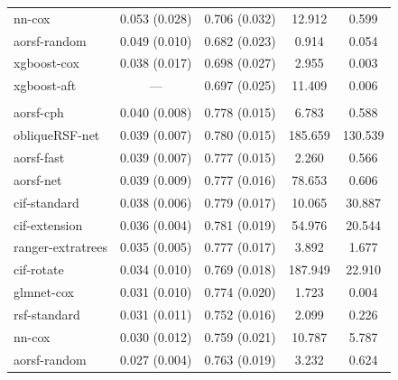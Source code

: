 \documentclass{article}\usepackage[]{graphicx}\usepackage[]{xcolor}
\newenvironment{knitrout}{}{} %
\begin{document}
\begin{knitrout}
\begin{longtable}[t]{lcccc}
\hspace{1em}nn-cox & 0.053 (0.028) & 0.706 (0.032) & 12.912 & 0.599\\
\hspace{1em}aorsf-random & 0.049 (0.010) & 0.682 (0.023) & 0.914 & 0.054\\
\hspace{1em}xgboost-cox & 0.038 (0.017) & 0.698 (0.027) & 2.955 & 0.003\\
\hspace{1em}xgboost-aft & --- & 0.697 (0.025) & 11.409 & 0.006\\
\addlinespace[0.3em]
\multicolumn{5}{l}{\textit{\textbf{JHS; coronary heart disease, n = 3501, p = 80}}}\\
\hline
\hspace{1em}aorsf-cph & 0.040 (0.008) & 0.778 (0.015) & 6.783 & 0.588\\
\hspace{1em}obliqueRSF-net & 0.039 (0.007) & 0.780 (0.015) & 185.659 & 130.539\\
\hspace{1em}aorsf-fast & 0.039 (0.007) & 0.777 (0.015) & 2.260 & 0.566\\
\hspace{1em}aorsf-net & 0.039 (0.009) & 0.777 (0.016) & 78.653 & 0.606\\
\hspace{1em}cif-standard & 0.038 (0.006) & 0.779 (0.017) & 10.065 & 30.887\\
\hspace{1em}cif-extension & 0.036 (0.004) & 0.781 (0.019) & 54.976 & 20.544\\
\hspace{1em}ranger-extratrees & 0.035 (0.005) & 0.777 (0.017) & 3.892 & 1.677\\
\hspace{1em}cif-rotate & 0.034 (0.010) & 0.769 (0.018) & 187.949 & 22.910\\
\hspace{1em}glmnet-cox & 0.031 (0.010) & 0.774 (0.020) & 1.723 & 0.004\\
\hspace{1em}rsf-standard & 0.031 (0.011) & 0.752 (0.016) & 2.099 & 0.226\\
\hspace{1em}nn-cox & 0.030 (0.012) & 0.759 (0.021) & 10.787 & 5.787\\
\hspace{1em}aorsf-random & 0.027 (0.004) & 0.763 (0.019) & 3.232 & 0.624\\

\end{longtable}
\end{knitrout}
\end{document}
